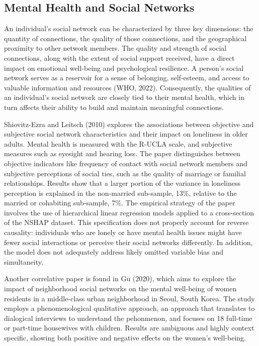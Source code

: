 \subsection{Mental Health and Social Networks}
    An individual's social network can be characterized by three key dimensions: the quantity of connections, the quality of those connections, and the geographical proximity to other network members. The quality and strength of social connections, along with the extent of social support received, have a direct impact on emotional well-being and psychological resilience. A person's social network serves as a reservoir for a sense of belonging, self-esteem, and access to valuable information and resources (WHO, 2022).
    Consequently, the qualities of an individual's social network are closely tied to their mental health, which in turn affects their ability to build and maintain meaningful connections. 

    Shiovitz-Ezra and Leitsch (2010) explores the associations between objective and subjective social network characteristics and their impact on loneliness in older adults. Mental health is measured with the R-UCLA scale, and subjective measures such as eyesight and hearing loss. The paper distinguishes between objective indicators like frequency of contact with social network members and subjective perceptions of social ties, such as the quality of marriage or familial relationships. Results show that a larger portion of the variance in loneliness perception is explained in the non-married sub-sample, 13\%, relative to the married or cohabiting sub-sample, 7\%.
    The empirical strategy of the paper involves the use of hierarchical linear regression models applied to a cross-section of the NSHAP dataset. This specification does not properly account for reverse causality:  individuals who are lonely or have mental health issues might have fewer social interactions or perceive their social networks differently. In addition, the model does not adequately address likely omitted variable bias and simultaneity.

    Another correlative paper is found in Gu (2020), which aims to explore the impact of neighborhood social networks on the mental well-being of women residents in a middle-class urban neighborhood in Seoul, South Korea. The study employs a phenomenological qualitative approach, an approach that translates to dialogical interviews to understand the pehonmenon, and focuses on 18 full-time or part-time housewives with children. Results are ambiguous and highly context specific, showing both positive and negative effects on the women's well-being.

